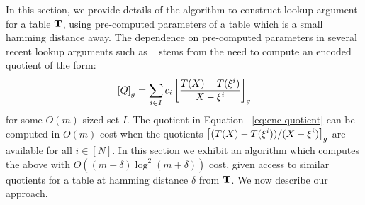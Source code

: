 
In this section, we provide details of the algorithm to construct lookup argument for a table $\mathbf{T}$,
using pre-computed parameters of a table  which is a small hamming distance away. The dependence on
pre-computed parameters in several recent lookup arguments such as ~\cite{CCS:ZBKMNS22,EPRINT:PosKat22,EPRINT:ZGKMR22,EPRINT:EagFioGab22}
stems from the need to compute an encoded quotient of the form:
\begin{equation}\label{eq:enc-quotient}
\left[{Q}\right]_g = \sum_{i\in I}c_i\left[{\frac{T(X) - T(\xi^i)}{X-\xi^i}}\right]_g
\end{equation}
for some $O(m)$ sized set $I$. The quotient in Equation ~\eqref{eq:enc-quotient} can be computed in $O(m)$ cost
when the quotients $\left[{(T(X)-T(\xi^i))/(X-\xi^i)}\right]_g$ are available for all $i\in [N]$. In this section
we exhibit an algorithm which computes the above with $O((m+\delta)\log^2(m+\delta))$ cost, given access to
similar quotients for a table at hamming distance $\delta$ from $\mathbf{T}$. We now describe our approach.

